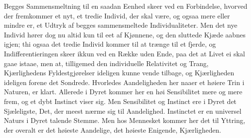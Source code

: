 \documentclass[12pt,a4paper]{book}
\newcommand{\apage}[1]{\marginnote{\footnotesize\textit{[#1]}}}
\begin{document}
Begges Sammensmeltning til en saadan Eenhed skeer ved en Forbindelse,
hvorved der fremkommer et nyt, et tredie Individ, der skal være, og
ogsaa mere eller mindre er, et Udtryk af begges sammensmeltede
Individualiteter. Men det nye Individ hører dog nu altid kun til eet af
Kjønnene, og den sluttede Kjæde aabnes igjen; thi ogsaa det tredie
Individ kommer til at trænge til et fjerde, og Indifferentieringen skeer
ikkun ved en Række uden Ende, paa det at Livet ei skal gaae istaae, men
at, tilligemed den individuelle Relativitet og Trang, Kjærlighedens
Fyldestgjørelser ideligen kunne \apage{42} vende tilbage, og Kjærligheden ideligen
forene det Sondrede. Hvorledes Aandeligheden her naaer et høiere Trin i
Naturen, er klart. Allerede i Dyret kommer her en høi Sensibilitet mere
og mere frem, og et dybt Instinct viser sig. Men Sensibilitet og
Instinct ere i Dyret det Sjæleligste, Det, der meest nærme sig til
Aandelighed. Instinctet er en universel Naturs i Dyret talende Stemme.
Men hos Mennesket kommer her det til Yttring, der overalt er det høieste
Aandelige, det høieste Enigende, Kjærligheden.
\end{document}
